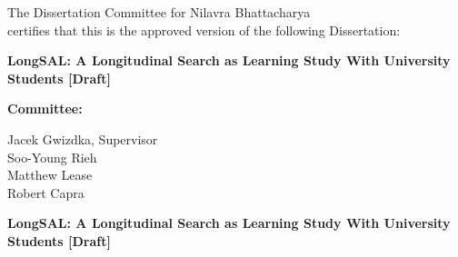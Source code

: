 \documentclass[letterpaper, nobind]{templates/ociamthesis}
\begin{document}
\begin{romanpages}



\thispagestyle{empty} %
\begin{center}
  The Dissertation Committee for Nilavra Bhattacharya\\
  certifies that this is the approved version of the following Dissertation:\\
  \vspace*{30pt}
  \begin{spacing}{2}
    {\Large{\textbf{LongSAL: A Longitudinal Search as Learning Study With University Students {[}Draft{]}}}}
  \end{spacing}
\end{center}

\vspace*{55pt}

\phantom{x}\hspace{45ex} {\large{\textbf{Committee:}}}\\

\begin{flushright}
  Jacek Gwizdka, Supervisor\\
  \vspace*{24pt}
  Soo-Young Rieh\\
  \vspace*{24pt}
  Matthew Lease\\
  \vspace*{24pt}
  Robert Capra
\end{flushright}


\newpage
\thispagestyle{empty} %
\begin{center}
  
  \begin{spacing}{2}
    {\Large{\textbf{LongSAL: A Longitudinal Search as Learning Study With University Students {[}Draft{]}}}}
  \end{spacing}
  

\end{center}
\end{romanpages}
\end{document}
